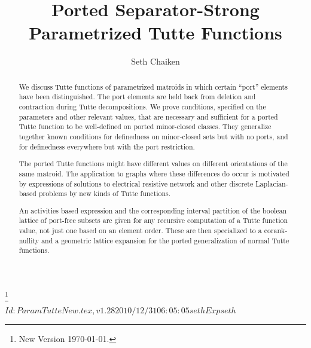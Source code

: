 \documentclass[12pt,leqno]{amsart}
\theoremstyle{remark}
\begin{document}
\title[Ported Separator-Strong Parametrized Tutte Functions]
{Ported Separator-Strong 
Parametrized Tutte Functions}

\author{Seth Chaiken}
\address{Computer Science Department\\
The University at Albany (SUNY)\\
Albany, NY 12222, U.S.A.}



\begin{abstract}
We discuss Tutte functions of parametrized matroids in which
certain ``port'' elements have been distinguished.
The port elements are held back from deletion and contraction
during Tutte decompositions.  We prove conditions, specified on the parameters
and other relevant values,
that are necessary and sufficient for a ported Tutte function to be well-defined
on ported minor-closed classes.
They generalize together known  
conditions for definedness on minor-closed sets but with no ports, and
for definedness everywhere but with the port restriction.  

The ported Tutte functions might have different values
on different orientations of the same matroid.
The 
application to graphs where these
differences do occur is motivated by
expressions of solutions to electrical resistive network
and other discrete Laplacian-based problems by new kinds of Tutte functions.

An activities based expression and the corresponding
interval partition of the boolean lattice of port-free subsets
are 
given for any recursive computation of a Tutte function value, 
not just one based on an element order.  These are then specialized to
a corank-nullity and a geometric lattice expansion for the ported
generalization of normal Tutte functions.
\end{abstract}





\thanks{New Version \today.}

\maketitle
\pagestyle{headings}

\RCSID $Id: ParamTutteNew.tex,v 1.28 2010/12/31 06:05:05 seth Exp seth $
\end{document}
